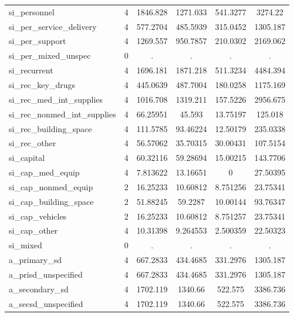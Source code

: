 \begin{table}[htbp]
\begin{tabular}{l*{1}{ccccc}}
si\_personnel&           4&    1846.828&    1271.033&    541.3277&     3274.22\\
si\_per\_service\_delivery&           4&    577.2704&    485.5939&    315.0452&    1305.187\\
si\_per\_support&           4&    1269.557&    950.7857&    210.0302&    2169.062\\
si\_per\_mixed\_unspec&           0&           .&           .&           .&           .\\
si\_recurrent&           4&    1696.181&    1871.218&    511.3234&    4484.394\\
si\_rec\_key\_drugs&           4&    445.0639&    487.7004&    180.0258&    1175.169\\
si\_rec\_med\_int\_supplies&           4&    1016.708&    1319.211&    157.5226&    2956.675\\
si\_rec\_nonmed\_int\_supplies&           4&    66.25951&      45.593&    13.75197&     125.018\\
si\_rec\_building\_space&           4&    111.5785&    93.46224&    12.50179&    235.0338\\
si\_rec\_other&           4&    56.57062&    35.70315&    30.00431&    107.5154\\
si\_capital  &           4&    60.32116&    59.28694&    15.00215&    143.7706\\
si\_cap\_med\_equip&           4&    7.813622&    13.16651&           0&    27.50395\\
si\_cap\_nonmed\_equip&           2&    16.25233&    10.60812&    8.751256&    23.75341\\
si\_cap\_building\_space&           2&    51.88245&     59.2287&    10.00144&    93.76347\\
si\_cap\_vehicles&           2&    16.25233&    10.60812&    8.751257&    23.75341\\
si\_cap\_other&           4&    10.31398&    9.264553&    2.500359&    22.50323\\
si\_mixed    &           0&           .&           .&           .&           .\\
a\_primary\_sd&           4&    667.2833&    434.4685&    331.2976&    1305.187\\
a\_prisd\_unspecified&           4&    667.2833&    434.4685&    331.2976&    1305.187\\
a\_secondary\_sd&           4&    1702.119&     1340.66&     522.575&    3386.736\\
a\_secsd\_unspecified&           4&    1702.119&     1340.66&     522.575&    3386.736\\

\end{tabular}
\end{table}
